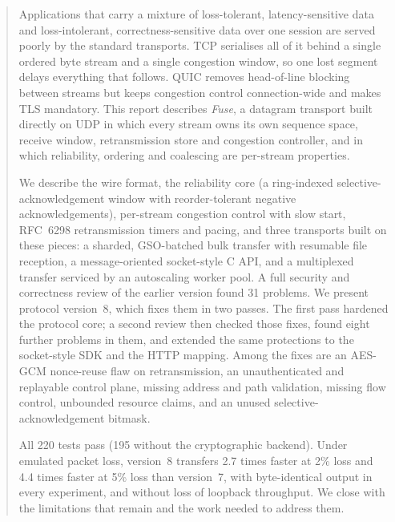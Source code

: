 \documentclass[11pt,a4paper,oneside]{report}
\begin{document}
\begin{abstract}
\noindent
Applications that carry a mixture of loss-tolerant, latency-sensitive data and loss-intolerant,
correctness-sensitive data over one session are served poorly by the standard transports. TCP serialises all of
it behind a single ordered byte stream and a single congestion window, so one lost segment delays everything that
follows. QUIC removes head-of-line blocking between streams but keeps congestion control connection-wide and
makes TLS mandatory. This report describes \emph{Fuse}, a datagram transport built directly on UDP in which every
stream owns its own sequence space, receive window, retransmission store and congestion controller, and in which
reliability, ordering and coalescing are per-stream properties.

We describe the wire format, the reliability core (a ring-indexed selective-acknowledgement window with
reorder-tolerant negative acknowledgements), per-stream congestion control with slow start, RFC~6298
retransmission timers and pacing, and three transports built on these pieces: a sharded, GSO-batched bulk
transfer with resumable file reception, a message-oriented socket-style C API, and a multiplexed transfer
serviced by an autoscaling worker pool. A full security and correctness review of the earlier version found 31
problems. We present protocol version~8, which fixes them in two passes. The first pass hardened the protocol
core; a second review then checked those fixes, found eight further problems in them, and extended the same
protections to the socket-style SDK and the HTTP mapping. Among the fixes are an AES-GCM nonce-reuse flaw on
retransmission, an unauthenticated and replayable control plane, missing address and path validation, missing
flow control, unbounded resource claims, and an unused selective-acknowledgement bitmask.

All 220 tests pass (195 without the cryptographic backend). Under emulated packet loss, version~8 transfers 2.7
times faster at 2\% loss and 4.4 times faster at 5\% loss than version~7, with byte-identical output in every
experiment, and without loss of loopback throughput. We close with the limitations that remain and the work
needed to address them.
\end{abstract}

\tableofcontents
\listoffigures
\listoftables

\clearpage
{}












\appendix



\end{document}

